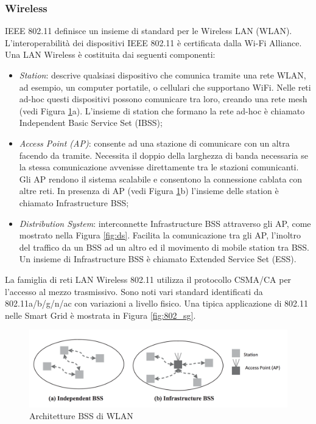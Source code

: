 \subsubsection{Wireless}%
IEEE 802.11 definisce un insieme di standard per le Wireless LAN (WLAN). L'interoperabilità dei dispositivi IEEE 802.11 è certificata dalla Wi-Fi Alliance. Una LAN Wireless è costituita dai seguenti componenti:
\begin{itemize}
	\item\emph{Station}: descrive qualsiasi dispositivo che comunica tramite una rete WLAN, ad esempio, un computer portatile, o cellulari che supportano WiFi. Nelle reti ad-hoc questi dispositivi possono comunicare tra loro, creando una rete mesh (vedi Figura \ref{fig:bss}a). L'insieme di station che formano la rete ad-hoc è chiamato Independent Basic Service Set (IBSS);
	\item\emph{Access Point (AP)}: consente ad una stazione di comunicare con un altra facendo da tramite. Necessita il doppio della larghezza di banda necessaria se la stessa comunicazione avvenisse direttamente tra le stazioni comunicanti. Gli AP rendono il sistema scalabile e consentono la connessione cablata con altre reti. In presenza di AP (vedi Figura \ref{fig:bss}b) l'insieme delle station è chiamato Infrastructure BSS;
	\item\emph{Distribution System}: interconnette Infrastructure BSS attraverso gli AP, come mostrato nella Figura \ref{fig:ds}. Facilita la comunicazione tra gli AP, l'inoltro del traffico da un BSS ad un altro ed il movimento di mobile station tra BSS. Un insieme di Infrastructure BSS è chiamato Extended Service Set (ESS).
\end{itemize}
La famiglia di reti LAN Wireless 802.11 utilizza il protocollo CSMA/CA per l'accesso al mezzo trasmissivo. Sono noti vari standard identificati da 802.11a/b/g/n/ac con variazioni a livello fisico. Una tipica applicazione di 802.11 nelle Smart Grid è mostrata in Figura \ref{fig:802_sg}.
\begin{figure}[h]
	\centering
	\includegraphics[scale=0.350]{imgs/bss.png}
	\caption{Architetture BSS di WLAN} \label{fig:bss}
\end{figure}

